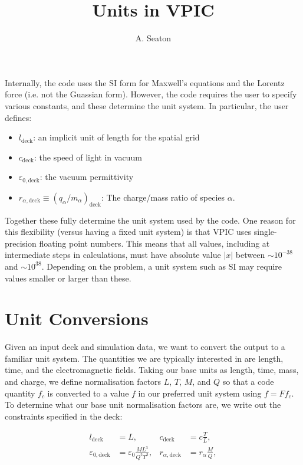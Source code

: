 \documentclass[twocolumn,10pt]{article}
\title{Units in VPIC}
\author{A. Seaton}
\begin{document}
	\maketitle

	Internally, the code uses the SI form for Maxwell's equations and the Lorentz force (i.e. not the Guassian form). However, the code requires the user to specify various constants, and these determine the unit system. In particular, the user defines:

	\begin{itemize}
		\item $l_{\mathrm{deck}}$: an implicit unit of length for the spatial grid
		\item $c_{\mathrm{deck}}$: the speed of light in vacuum
		\item $\varepsilon_{0,\mathrm{deck}}$: the vacuum permittivity
		\item $r_{\alpha,\mathrm{deck}} \equiv (q_{\alpha}/m_{\alpha})_{\mathrm{deck}}$: The charge/mass ratio of species $\alpha$.
	\end{itemize}

	\noindent Together these fully determine the unit system used by the code. One reason for this flexibility (versus having a fixed unit system) is that VPIC uses single-precision floating point numbers. This means that all values, including at intermediate steps in calculations, must have absolute value $|x|$ between $\sim 10^{-38}$ and $\sim 10^{38}$. Depending on the problem, a unit system such as SI may require values smaller or larger than these.

	\section{Unit Conversions}

	Given an input deck and simulation data, we want to convert the output to a familiar unit system. The quantities we are typically interested in are length, time, and the electromagnetic fields. Taking our base units as length, time, mass, and charge, we define normalisation factors $L$, $T$, $M$, and $Q$ so that a code quantity $f_{c}$ is converted to a value $f$ in our preferred unit system using $f = Ff_c$. To determine what our base unit normalisation factors are, we write out the constraints specified in the deck:

	\begin{align*}
		l_{\mathrm{deck}} &= L, &
		c_{\mathrm{deck}} &= c\frac{T}{L}, \\
		\varepsilon_{0,\mathrm{deck}} &= \varepsilon_0\frac{ML^3}{Q^2T^2}, &
		r_{\alpha,\mathrm{deck}} &= r_{\alpha}\frac{M}{Q},
	\end{align*}
\end{document}
